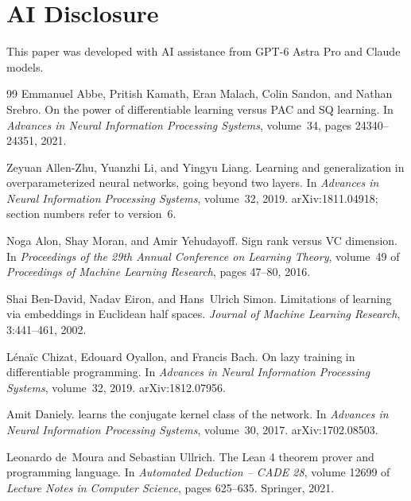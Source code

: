 \documentclass[11pt,letterpaper,pmlr,twoside]{jmlr}
\begin{document}
\section*{AI Disclosure}
This paper was developed with AI assistance from GPT-6 Astra Pro and Claude models.

\begin{thebibliography}{99}
Emmanuel Abbe, Pritish Kamath, Eran Malach, Colin Sandon, and Nathan Srebro.
\newblock On the power of differentiable learning versus {PAC} and {SQ} learning.
\newblock In \emph{Advances in Neural Information Processing Systems}, volume~34, pages 24340--24351, 2021.

Zeyuan Allen-Zhu, Yuanzhi Li, and Yingyu Liang.
\newblock Learning and generalization in overparameterized neural networks, going beyond two layers.
\newblock In \emph{Advances in Neural Information Processing Systems}, volume~32, 2019.
\newblock arXiv:1811.04918; section numbers refer to version~6.

Noga Alon, Shay Moran, and Amir Yehudayoff.
\newblock Sign rank versus {VC} dimension.
\newblock In \emph{Proceedings of the 29th Annual Conference on Learning Theory}, volume~49 of \emph{Proceedings of Machine Learning Research}, pages 47--80, 2016.

Shai Ben-David, Nadav Eiron, and Hans~Ulrich Simon.
\newblock Limitations of learning via embeddings in {E}uclidean half spaces.
\newblock \emph{Journal of Machine Learning Research}, 3:441--461, 2002.

L\'ena\"ic Chizat, Edouard Oyallon, and Francis Bach.
\newblock On lazy training in differentiable programming.
\newblock In \emph{Advances in Neural Information Processing Systems}, volume~32, 2019.
\newblock arXiv:1812.07956.

Amit Daniely.
 learns the conjugate kernel class of the network.
\newblock In \emph{Advances in Neural Information Processing Systems}, volume~30, 2017.
\newblock arXiv:1702.08503.

Leonardo de~Moura and Sebastian Ullrich.
\newblock The {L}ean 4 theorem prover and programming language.
\newblock In \emph{Automated Deduction -- CADE 28}, volume 12699 of \emph{Lecture Notes in Computer Science}, pages 625--635. Springer, 2021.


\end{thebibliography}
\end{document}
